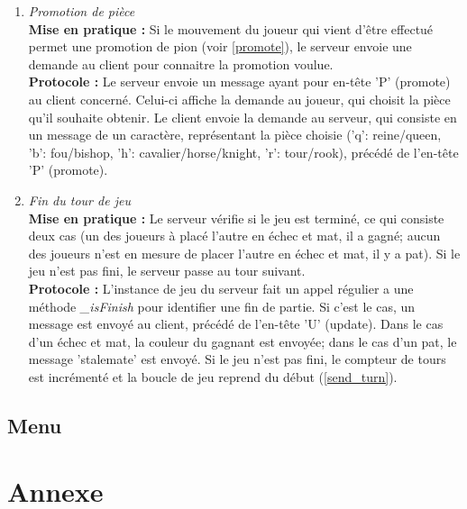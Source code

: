 \documentclass[10pt, a4paper]{article}
\begin{document}
\begin{enumerate}
\item \textit{Promotion de pièce}\\
\textbf{Mise en pratique :} Si le mouvement du joueur qui vient d'être effectué permet une promotion de pion (voir \ref{promote}), le serveur envoie une demande au client pour connaitre la promotion voulue.\\
\textbf{Protocole :} Le serveur envoie un message ayant pour en-tête 'P' (promote) au client concerné. Celui-ci affiche la demande au joueur, qui choisit la pièce qu'il souhaite obtenir. Le client envoie la demande au serveur, qui consiste en un message de un caractère, représentant la pièce choisie ('q':  reine/queen, 'b': fou/bishop, 'h': cavalier/horse/knight, 'r': tour/rook), précédé de l'en-tête 'P' (promote).

\item \textit{Fin du tour de jeu} \\
\textbf{Mise en pratique :} Le serveur vérifie si le jeu est terminé, ce qui consiste deux cas (un des joueurs à placé l'autre en échec et mat, il a gagné; aucun des joueurs n'est en mesure de placer l'autre en échec et mat, il y a pat). Si le jeu n'est pas fini, le serveur passe au tour suivant.\\
\textbf{Protocole :} L'instance de jeu du serveur fait un appel régulier a une méthode \textit{\_isFinish} pour identifier une fin de partie. Si c'est le cas, un message est envoyé au client, précédé de l'en-tête 'U' (update). Dans le cas d'un échec et mat, la couleur du gagnant est envoyée; dans le cas d'un pat, le message 'stalemate' est envoyé. Si le jeu n'est pas fini, le compteur de tours est incrémenté et la boucle de jeu reprend du début (\ref{send_turn}).

\end{enumerate}

\subsection{Menu}

\section{Annexe}
\end{document}
